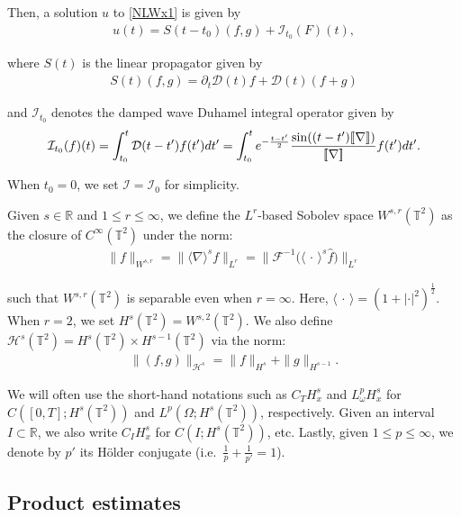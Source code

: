 \documentclass[letterpaper, 11pt,  reqno]{amsart}
\newcommand{\1}{\hspace{0.5mm}\text{I}\hspace{0.2mm}}
\newcommand{\noi}{\noindent}
\newcommand{\R}{\mathbb{R}}
\newcommand{\T}{\mathbb{T}}
\newcommand{\D}{\mathcal{D}}
\renewcommand{\H}{\mathcal{H}}
\newcommand{\dt}{\partial_t}
\newcommand{\nb}{\nabla}
\newcommand{\ft}{\widehat}
\newcommand{\F}{\mathcal{F}}
\newcommand{\jb}[1]{\langle #1 \rangle}
\newcommand{\jbb}[1]{[\hspace{-0.6mm}[ #1 ]\hspace{-0.6mm}]}
\newcommand{\I}{\mathcal{I}}
\numberwithin{equation}{section}
\numberwithin{theorem}{section}
\begin{document}
\noi
Then, a solution $u$ to \eqref{NLWx1}
is 
given by 
\begin{align*}
u(t) = S(t - t_0) (f, g) + \I_{t_0}(F)(t), 
\end{align*}


\noi
where  $S(t)$ is the linear propagator given by 
\begin{align}
    S (t) (f, g) =  \dt \D (t) f + \D (t) (f + g)
\label{D4}
\end{align}


\noi
and $\I_{t_0}$ denotes the damped wave Duhamel integral operator given by 
\begin{align}
\I_{t_0} (f) (t) =  \int_{t_0}^t \D (t - t') f (t') d t' 
= \int_{t_0}^t e^{- \frac{t - t'}{2}} \frac{\sin ( (t - t') \jbb{\nb} )}{\jbb{\nb}} f (t') d t'.
\label{D5}
\end{align}


\noi
When $t_0 = 0$, 
we set $\I = \I_0$
for simplicity.


Given $s \in \R$ and $1 \leq r \leq \infty$, we define the $L^r$-based Sobolev space $W^{s, r} (\T^2)$ 
as the closure of $C^\infty(\T^2)$ under 
 the norm: 
\begin{align*}
    \| f \|_{W^{s, r}} =  \| \jb{\nb}^s f \|_{L^r} 
= \big\| \F^{-1}\big(\jb{\,\cdot\,}^s \ft f\big) \big\|_{L^r}
\end{align*}

\noi
such that $W^{s, r} (\T^2)$
is separable even when $r = \infty$.
Here,  
 $\jb{\,\cdot\,} = (1 + |\cdot|^2)^{\frac 12}$. 
When $r = 2$, we set  $H^s (\T^2) = W^{s, 2} (\T^2)$.
We also define $\H^{s} (\T^2) = H^s (\T^2) \times H^{s - 1} (\T^2)$ via the norm:
\begin{align*}
    \| (f, g) \|_{\H^s} = \| f \|_{H^s} + \| g \|_{H^{s - 1}}.
\end{align*}



 We will often use the short-hand notations 
 such as $C_T H^{s}_x$ and $L^p_\omega H^{s}_x$ for $C( [0,T]; H^{s}(\T^2))$ and $L^p(\Omega; H^{s}(\T^2))$, respectively.
Given an interval $I \subset \R$, 
we also write 
$C_I H_x^s $ for $C (I; H^s (\T^2))$, etc.
Lastly, given $1 \leq p \leq \infty$, we denote by $p'$ its H\"older conjugate (i.e.~$\frac{1}{p} + \frac{1}{p'} = 1$).






\subsection{Product estimates}
\label{SUBSEC:2.2}
\end{document}
